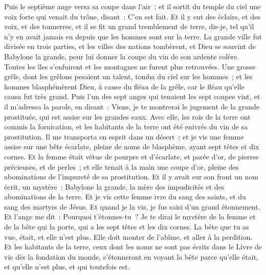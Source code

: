 \begin{multicols}{2}
Puis le septième ange versa sa coupe dans l'air~; et il sortit du temple du ciel une voix forte qui venait du trône, disant~: C'en est fait.
Et il y eut des éclairs, et des voix, et des tonnerres, et il se fit un grand tremblement de terre, dis-je, tel qu'il n'y en avait jamais eu depuis que les hommes sont sur la terre.
La grande ville fut divisée en trois parties, et les villes des nations tombèrent, et Dieu se souvint de Babylone la grande, pour lui donner la coupe du vin de son ardente colère.
Toutes les îles s'enfuirent et les montagnes ne furent plus retrouvées.
Une grosse grêle, dont les grêlons pesaient un talent, tomba du ciel sur les hommes~; et les hommes blasphémèrent Dieu, à cause du fléau de la grêle, car le fléau qu'elle causa fut très grand.
\VerseOne{}Puis l'un des sept anges qui tenaient les sept coupes vint, et il m'adressa la parole, en disant~: Viens, je te montrerai le jugement de la grande prostituée, qui est assise sur les grandes eaux.
Avec elle, les rois de la terre ont commis la fornication, et les habitants de la terre ont été enivrés du vin de sa prostitution.
Il me transporta en esprit dans un désert~; et je vis une femme assise sur une bête écarlate, pleine de noms de blasphème, ayant sept têtes et dix cornes.
Et la femme était vêtue de pourpre et d'écarlate, et parée d'or, de pierres précieuses, et de perles~; et elle tenait à la main une coupe d'or, pleine des abominations de l'impureté de sa prostitution.
Et il y avait sur son front un nom écrit, un mystère~: Babylone la grande, la mère des impudicités et des abominations de la terre.
Et je vis cette femme ivre du sang des saints, et du sang des martyrs de Jésus. Et quand je la vis, je fus saisi d'un grand étonnement.
Et l'ange me dit~: Pourquoi t'étonnes-tu~? Je te dirai le mystère de la femme et de la bête qui la porte, qui a les sept têtes et les dix cornes.
La bête que tu as vue, était, et elle n'est plus. Elle doit monter de l'abîme, et aller à la perdition. Et les habitants de la terre, ceux dont les noms ne sont pas écrits dans le Livre de vie dès la fondation du monde, s'étonneront en voyant la bête parce qu'elle était, et qu'elle n'est plus, et qui toutefois est.

\end{multicols}
